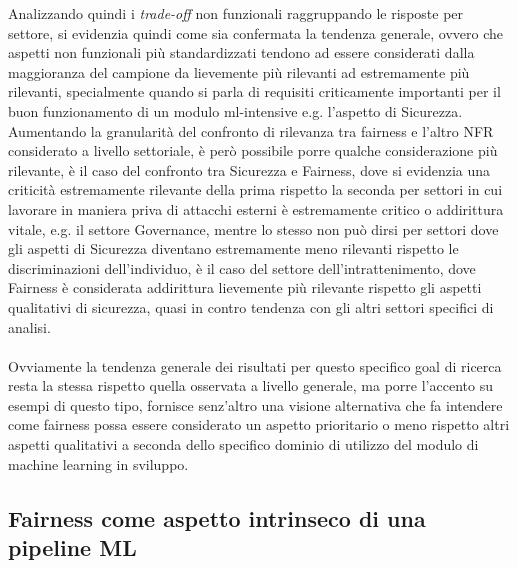     Analizzando quindi i \emph{trade-off} non funzionali raggruppando le risposte per settore, si evidenzia quindi come sia confermata la tendenza generale, ovvero che aspetti non funzionali più standardizzati tendono ad essere considerati dalla maggioranza del campione da lievemente più rilevanti ad estremamente più rilevanti, specialmente quando si parla di requisiti criticamente importanti per il buon funzionamento di un modulo ml-intensive e.g. l'aspetto di Sicurezza. Aumentando la granularità del confronto di rilevanza tra fairness e l'altro NFR considerato a livello settoriale, è però possibile porre qualche considerazione più rilevante, è il caso del confronto tra Sicurezza e Fairness, dove si evidenzia una criticità estremamente rilevante della prima rispetto la seconda per settori in cui lavorare in maniera priva di attacchi esterni è estremamente critico o addirittura vitale, e.g. il settore Governance, mentre lo stesso non può dirsi per settori dove gli aspetti di Sicurezza diventano estremamente meno rilevanti rispetto le discriminazioni dell'individuo, è il caso del settore dell'intrattenimento, dove Fairness è considerata addirittura lievemente più rilevante rispetto gli aspetti qualitativi di sicurezza, quasi in contro tendenza con gli altri settori specifici di analisi. \\\\
    
    Ovviamente la tendenza generale dei risultati per questo specifico goal di ricerca resta la stessa rispetto quella osservata a livello generale, ma porre l'accento su esempi di questo tipo, fornisce senz'altro una visione alternativa che fa intendere come fairness possa essere considerato un aspetto prioritario o meno rispetto altri aspetti qualitativi a seconda dello specifico dominio di utilizzo del modulo di machine learning in sviluppo.
    
    \subsection{Fairness come aspetto intrinseco di una pipeline ML}

    	\begin{center}
    	\hspace*{-5mm}%
    \end{center}
    
